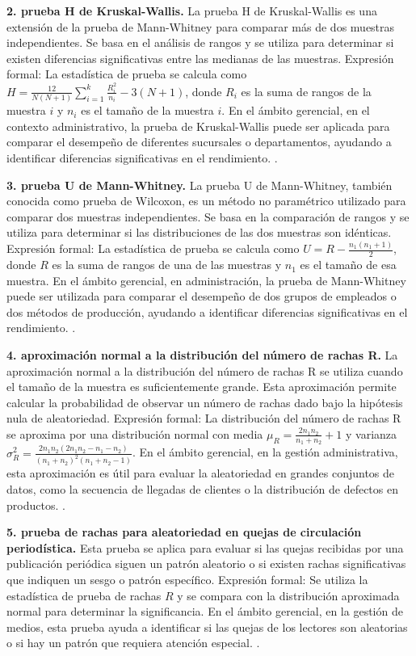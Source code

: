 {\textbf{2. prueba H de Kruskal-Wallis.} La prueba H de Kruskal-Wallis es una extensión de la prueba de Mann-Whitney para comparar más de dos muestras independientes. Se basa en el análisis de rangos y se utiliza para determinar si existen diferencias significativas entre las medianas de las muestras. Expresión formal: La estadística de prueba se calcula como $H = \frac{12}{N(N+1)} \sum_{i=1}^{k} \frac{R_i^2}{n_i} - 3(N+1)$, donde $R_i$ es la suma de rangos de la muestra $i$ y $n_i$ es el tamaño de la muestra $i$. En el ámbito gerencial, en el contexto administrativo, la prueba de Kruskal-Wallis puede ser aplicada para comparar el desempeño de diferentes sucursales o departamentos, ayudando a identificar diferencias significativas en el rendimiento. \citep{anderson2012,lind2012,wackerly2010}.

\textbf{3. prueba U de Mann-Whitney.} La prueba U de Mann-Whitney, también conocida como prueba de Wilcoxon, es un método no paramétrico utilizado para comparar dos muestras independientes. Se basa en la comparación de rangos y se utiliza para determinar si las distribuciones de las dos muestras son idénticas. Expresión formal: La estadística de prueba se calcula como $U = R - \frac{n_1(n_1 + 1)}{2}$, donde $R$ es la suma de rangos de una de las muestras y $n_1$ es el tamaño de esa muestra. En el ámbito gerencial, en administración, la prueba de Mann-Whitney puede ser utilizada para comparar el desempeño de dos grupos de empleados o dos métodos de producción, ayudando a identificar diferencias significativas en el rendimiento. \citep{anderson2012,lind2012,wackerly2010}.

\textbf{4. aproximación normal a la distribución del número de rachas R.} La aproximación normal a la distribución del número de rachas R se utiliza cuando el tamaño de la muestra es suficientemente grande. Esta aproximación permite calcular la probabilidad de observar un número de rachas dado bajo la hipótesis nula de aleatoriedad. Expresión formal: La distribución del número de rachas R se aproxima por una distribución normal con media $\mu_R = \frac{2n_1n_2}{n_1 + n_2} + 1$ y varianza $\sigma_R^2 = \frac{2n_1n_2(2n_1n_2 - n_1 - n_2)}{(n_1 + n_2)^2(n_1 + n_2 - 1)}$. En el ámbito gerencial, en la gestión administrativa, esta aproximación es útil para evaluar la aleatoriedad en grandes conjuntos de datos, como la secuencia de llegadas de clientes o la distribución de defectos en productos. \citep{anderson2012,lind2012,wackerly2010}.

\textbf{5. prueba de rachas para aleatoriedad en quejas de circulación periodística.} Esta prueba se aplica para evaluar si las quejas recibidas por una publicación periódica siguen un patrón aleatorio o si existen rachas significativas que indiquen un sesgo o patrón específico. Expresión formal: Se utiliza la estadística de prueba de rachas $R$ y se compara con la distribución aproximada normal para determinar la significancia. En el ámbito gerencial, en la gestión de medios, esta prueba ayuda a identificar si las quejas de los lectores son aleatorias o si hay un patrón que requiera atención especial. \citep{anderson2012,lind2012,wackerly2010}.

}
